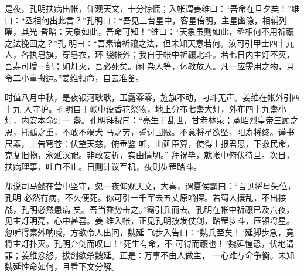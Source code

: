 是夜，孔明扶病出帐，仰观天文，十分惊慌；入帐谓姜维曰：“吾命在旦夕矣！”维
曰：“丞相何出此言？”孔明曰：“吾见三台星中，客星倍明，主星幽隐，相辅列曜，其光
昏暗：天象如此，吾命可知！”维曰：“天象虽则如此，丞相何不用祈禳之法挽回之？”孔
明曰：“吾素谙祈禳之法，但未知天意若何。汝可引甲士四十九人，各执皂旗，穿皂衣，环
绕帐外；我自于帐中祈禳北斗。若七日内主灯不灭，吾寿可增一纪；如灯灭，吾必死矣。闲
杂人等，休教放入。凡一应需用之物，只令二小童搬运。”姜维领命，自去准备。

时值八月中秋，是夜银河耿耿，玉露零零，旌旗不动，刁斗无声。姜维在帐外引四十九
人守护。孔明自于帐中设香花祭物，地上分布七盏大灯，外布四十九盏小灯，内安本命灯一
盏。孔明拜祝曰：“亮生于乱世，甘老林泉；承昭烈皇帝三顾之恩，托孤之重，不敢不竭犬
马之劳，誓讨国贼。不意将星欲坠，阳寿将终。谨书尺素，上告穹苍：伏望天慈，俯垂鉴
听，曲延臣算，使得上报君恩，下救民命，克复旧物，永延汉祀。非敢妄祈，实由情切。”
拜祝毕，就帐中俯伏待旦。次日，扶病理事，吐血不止。日则计议军机，夜则步罡踏斗。

却说司马懿在营中坚守，忽一夜仰观天文，大喜，谓夏侯霸曰：“吾见将星失位，孔明
必然有病，不久便死。你可引一千军去五丈原哨探。若蜀人攘乱，不出接战，孔明必然患病
矣。吾当乘势击之。”霸引兵而去。孔明在帐中祈禳已及六夜，见主灯明亮，心中甚喜。姜
维入帐，正见孔明披发仗剑，踏罡步斗，压镇将星。忽听得寨外呐喊，方欲令人出问，魏延
飞步入告曰：“魏兵至矣！”延脚步急，竟将主灯扑灭。孔明弃剑而叹曰！“死生有命，不
可得而禳也！”魏延惶恐，伏地请罪；姜维忿怒，拔剑欲杀魏延。正是：万事不由人做主，
一心难与命争衡。未知魏延性命如何，且看下文分解。